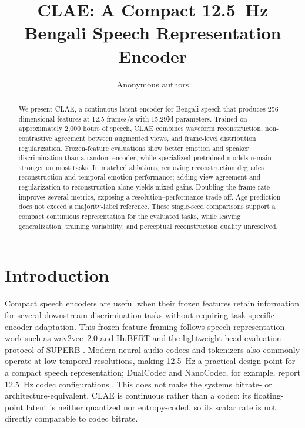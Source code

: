 \documentclass[11pt,a4paper]{article}
\title{CLAE: A Compact 12.5~Hz Bengali Speech Representation Encoder}
\author{Anonymous authors}
\begin{document}
\maketitle

\begin{abstract}
We present CLAE, a continuous-latent encoder for Bengali speech that produces 256-dimensional features at 12.5 frames/s with 15.29M parameters. Trained on approximately 2,000 hours of speech, CLAE combines waveform reconstruction, non-contrastive agreement between augmented views, and frame-level distribution regularization. Frozen-feature evaluations show better emotion and speaker discrimination than a random encoder, while specialized pretrained models remain stronger on most tasks. In matched ablations, removing reconstruction degrades reconstruction and temporal-emotion performance; adding view agreement and regularization to reconstruction alone yields mixed gains. Doubling the frame rate improves several metrics, exposing a resolution--performance trade-off. Age prediction does not exceed a majority-label reference. These single-seed comparisons support a compact continuous representation for the evaluated tasks, while leaving generalization, training variability, and perceptual reconstruction quality unresolved.
\end{abstract}

\section{Introduction}

Compact speech encoders are useful when their frozen features retain information for several downstream discrimination tasks without requiring task-specific encoder adaptation. This frozen-feature framing follows speech representation work such as wav2vec~2.0 and HuBERT \citep{baevski2020wav2vec2,hsu2021hubert} and the lightweight-head evaluation protocol of SUPERB \citep{yang2021superb}. Modern neural audio codecs and tokenizers also commonly operate at low temporal resolutions, making 12.5~Hz a practical design point for a compact speech representation; DualCodec and NanoCodec, for example, report 12.5~Hz codec configurations \citep{li2025dualcodec,casanova2025nanocodec}. This does not make the systems bitrate- or architecture-equivalent. CLAE is continuous rather than a codec: its floating-point latent is neither quantized nor entropy-coded, so its scalar rate is not directly comparable to codec bitrate.
\end{document}
